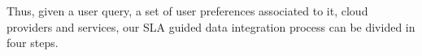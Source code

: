 %

%

Thus, given a user query, a set of user preferences associated to it, cloud providers and services, our SLA guided data integration process can be divided in four steps.
\bigskip

